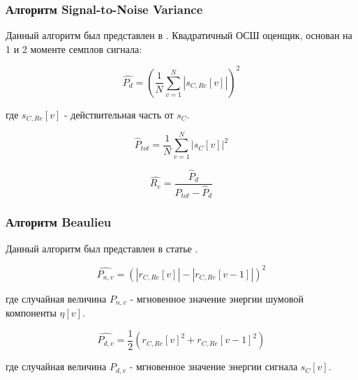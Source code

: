 \subsubsection{Алгоритм Signal-to-Noise Variance}
\label{sssec:snv}

Данный алгоритм был представлен в \cite{snr_pauluzzi, snr_li}. Квадратичный ОСШ оценщик, основан на 1
и 2 моменте семплов сигнала:

\begin{center}
\begin{equation}
	\hat{P_{d}} = (\frac{1}{N} \sum \limits_{v=1}^N \left| s_{C,Re}[v] \right|)^2
\end{equation}
\end{center}
где ${s_{C,Re}[v]}$ - действительная часть от ${s_C}$.

\begin{center}
\begin{equation}
	\hat P_{tot} = \frac{1}{N} \sum \limits_{v=1}^{N} \left|s_C[v] \right| ^2
\end{equation}
\end{center}

\begin{center}
\begin{equation}
	\hat{R_e} = \frac{\hat P_d}{\hat P_{tot} - \hat P_d}
\end{equation}
\end{center}

\subsubsection{Алгоритм Beaulieu}
\label{sssec:beaulieu}

Данный алгоритм был представлен в статье \cite{snr_beaulieu}.
\begin{center}
\begin{equation}
	\hat{P_{n,v}} = (\left| r_{C,Re}[v] \right| - \left| r_{C,Re}[v-1] \right|)^2
\end{equation}
\end{center}
где случайная величина ${P_{n,v}}$ - мгновенное значение энергии шумовой компоненты ${\eta[v]}$.

\begin{center}
\begin{equation}
	\hat{P_{d,v}} = \frac{1}{2}(r_{C,Re}[v]^2 + r_{C,Re}[v-1]^2)
\end{equation}
\end{center}
где случайная величина ${P_{d,v}}$ - мгновенное значение энергии сигнала ${s_C[v]}$.

